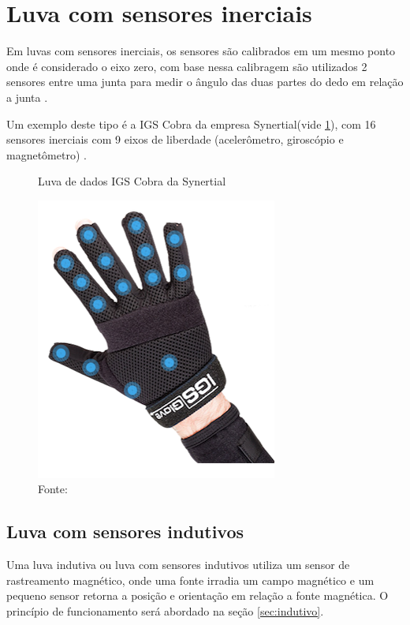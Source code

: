 	\section{Luva com sensores inerciais}
	
Em luvas com sensores inerciais, os sensores são calibrados em um mesmo ponto onde é considerado o eixo zero, com base nessa calibragem são utilizados 2 sensores entre uma junta para medir o ângulo das duas partes do dedo em relação a junta \cite{calculojunta}.

Um exemplo deste tipo é a IGS Cobra da empresa Synertial(vide \ref{fig:Cobra}), com 16 sensores inerciais com 9 eixos de liberdade 
(acelerômetro, giroscópio e magnetômetro) \cite{synert}.
		
		
	\begin{figure}[H]
		\vspace{4mm}
		\centering
		\caption{Luva de dados IGS Cobra da Synertial}
		\label{fig:Cobra}
		\includegraphics[scale=0.5]{imagens/Cobra.png}		
		\caption*{Fonte: }
	\end{figure}

		
		
\subsection{Luva com sensores indutivos}
Uma luva indutiva ou luva com sensores indutivos utiliza um sensor de rastreamento magnético, onde uma fonte irradia um campo magnético e um pequeno sensor retorna a posição e orientação em relação a fonte magnética. O princípio de  funcionamento será abordado na seção \ref{sec:indutivo}.